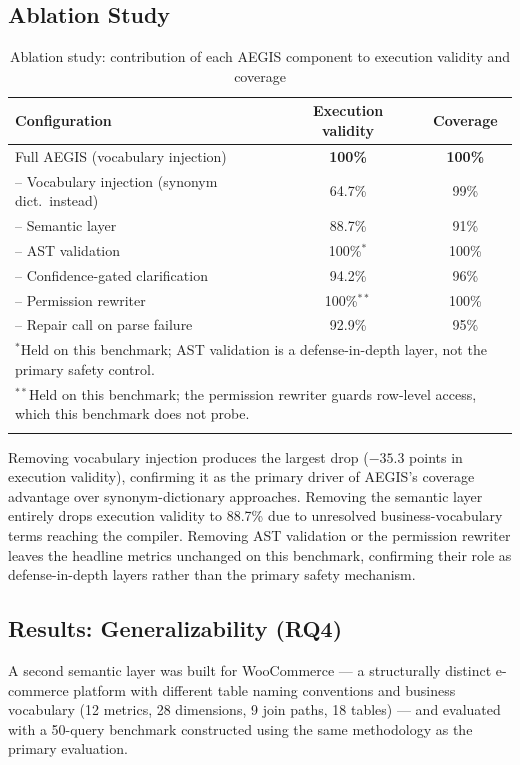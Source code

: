 \documentclass[11pt]{article}
\begin{document}
\subsection{Ablation Study}
\begin{longtable}{lcc}
\toprule
\textbf{Configuration} & \textbf{Execution validity} & \textbf{Coverage}\\
\midrule
Full AEGIS (vocabulary injection) & \textbf{100\%} & \textbf{100\%}\\
-- Vocabulary injection (synonym dict.\ instead) & 64.7\% & 99\%\\
-- Semantic layer & 88.7\% & 91\%\\
-- AST validation & 100\%$^{*}$ & 100\%\\
-- Confidence-gated clarification & 94.2\% & 96\%\\
-- Permission rewriter & 100\%$^{**}$ & 100\%\\
-- Repair call on parse failure & 92.9\% & 95\%\\
\bottomrule
\multicolumn{3}{l}{\small $^{*}$Held on this benchmark; AST validation is a defense-in-depth layer, not the primary safety control.}\\
\multicolumn{3}{l}{\small $^{**}$Held on this benchmark; the permission rewriter guards row-level access, which this benchmark does not probe.}\\
\caption{Ablation study: contribution of each AEGIS component to execution validity and coverage}\label{tab:ablation}
\end{longtable}
Removing vocabulary injection produces the largest drop ($-35.3$ points in execution validity), confirming it as the primary driver of AEGIS's coverage advantage over synonym-dictionary approaches. Removing the semantic layer entirely drops execution validity to 88.7\% due to unresolved business-vocabulary terms reaching the compiler. Removing AST validation or the permission rewriter leaves the headline metrics unchanged on this benchmark, confirming their role as defense-in-depth layers rather than the primary safety mechanism.

\subsection{Results: Generalizability (RQ4)}
A second semantic layer was built for WooCommerce --- a structurally distinct e-commerce platform with different table naming conventions and business vocabulary (12 metrics, 28 dimensions, 9 join paths, 18 tables) --- and evaluated with a 50-query benchmark constructed using the same methodology as the primary evaluation.
\end{document}

